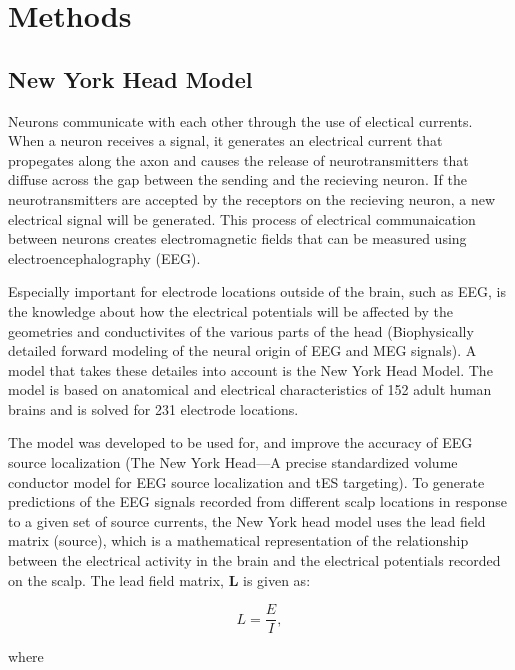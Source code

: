 \documentclass[a4paper, UKenglish, 11pt]{uiomaster}
\begin{document}
\chapter{Methods}

\section{New York Head Model}

Neurons communicate with each other through the use of electical currents. When a neuron receives a signal, it generates an electrical current that propegates along the axon and causes the release of neurotransmitters that diffuse across the gap between the sending and the recieving neuron. If the neurotransmitters are accepted by the receptors on the recieving neuron, a new electrical signal will be generated. This process of electrical communaication between neurons creates electromagnetic fields that can be measured using electroencephalography (EEG).

Especially important for electrode locations outside of the brain, such as EEG, is the knowledge about how the electrical potentials will be affected by the geometries and conductivites of the various parts of the head (Biophysically detailed forward modeling of the neural origin of EEG and MEG signals). A model that takes these detailes into account is the New York Head Model. The model is based on anatomical and electrical characteristics of 152 adult human brains and is solved for 231 electrode locations.

The model was developed to be used for, and improve the accuracy of EEG source localization (The New York Head—A precise standardized volume conductor model for EEG source localization and tES targeting). To generate predictions of the EEG signals recorded from different scalp locations in response to a given set of source currents, the New York head model uses the lead field matrix (source), which is a mathematical representation of the relationship between the electrical activity in the brain and the electrical potentials recorded on the scalp. The lead field matrix, $\boldsymbol{L}$ is given as:

\begin{equation}
L = \frac{E}{I},
\label{eq:R2}
\end{equation}

where

\end{document}
